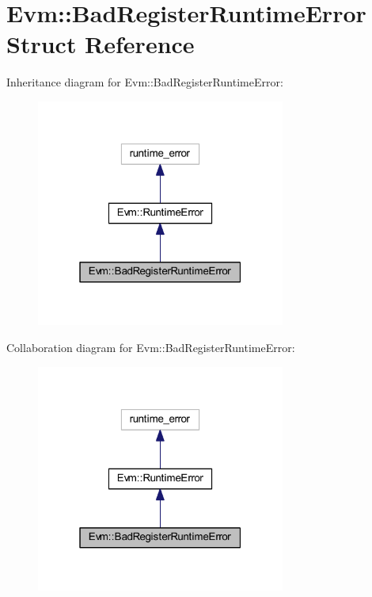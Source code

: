 \hypertarget{struct_evm_1_1_bad_register_runtime_error}{}\section{Evm\+:\+:Bad\+Register\+Runtime\+Error Struct Reference}
\label{struct_evm_1_1_bad_register_runtime_error}


Inheritance diagram for Evm\+:\+:Bad\+Register\+Runtime\+Error\+:
\nopagebreak
\begin{figure}[H]
\begin{center}
\leavevmode
\includegraphics[width=232pt]{struct_evm_1_1_bad_register_runtime_error__inherit__graph}
\end{center}
\end{figure}


Collaboration diagram for Evm\+:\+:Bad\+Register\+Runtime\+Error\+:
\nopagebreak
\begin{figure}[H]
\begin{center}
\leavevmode
\includegraphics[width=232pt]{struct_evm_1_1_bad_register_runtime_error__coll__graph}
\end{center}
\end{figure}
